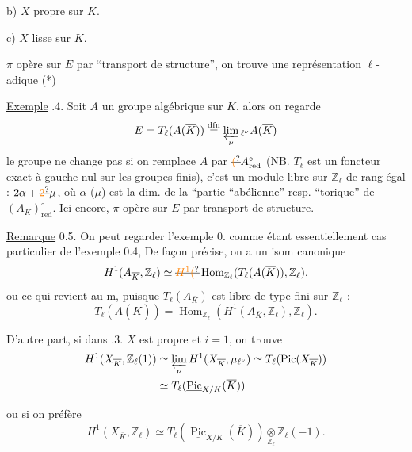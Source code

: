 b) \(X\) propre sur \(K\).

c) \(X\) lisse sur \(K\).

 \(\pi\) opère sur  \(E\) par ``transport de structure'', on trouve une représentation \(\ell\)-adique (*)

\uline{Exemple} .4. Soit \(A\) un  groupe algébrique  sur \(K\).  alors on regarde
\[
E=T_\ell(A(\overline K))\overset{\mathrm{dfn}}{=}\varprojlim_{\nu}{}_{\ell^\nu}A(\overline K)
\]
 le groupe ne change pas si on remplace \(A\) par \(\deleted{\unsure{(}}A^\circ_{\mathrm{red}}\) (NB. \(T_\ell\) est un foncteur exact à gauche nul sur les groupes finis), c'est un  \uline{module libre sur} \(\mathbb Z_\ell\) de rang égal : \(2\alpha+\deleted{\unsure{2}}\mu\), où \(\alpha\) (\(\mu\)) est la dim. de la ``partie ``abélienne'' resp.  ``torique'' de \((A_K)^\circ_{\mathrm{red}}\). Ici encore, \(\pi\) opère sur \(E\) par transport de structure.

\uline{Remarque} 0.5. On peut regarder l'exemple 0. comme étant essentiellement   cas particulier de l'exemple 0.4,  De façon précise, on a un isom canonique
\[
H^1(A_{\overline K},\mathbb Z_\ell)\simeq\deleted{\unsure{H^1(}}\operatorname{Hom}_{\mathbb Z_\ell}(T_\ell(A(\overline K)),\mathbb Z_\ell),
\]
ou ce qui revient au \(\overline{\mathrm m}\), puisque \(T_\ell(A_{\overline K})\) est libre de type fini sur \(\mathbb Z_\ell\) :
\[
T_\ell(A(\overline K))=\operatorname{Hom}_{\mathbb Z_\ell}(H^1(A_{\overline K},\mathbb Z_\ell),\mathbb Z_\ell).
\]

D'autre part,  si  dans .3. \(X\) est propre et \(i=1\), on trouve
\[
\begin{aligned}
H^1(X_{\overline K},\mathbb Z_\ell(1))&\simeq\varprojlim_\nu H^1(X_{\overline K},\mu_{\ell^\nu})\simeq T_\ell(\operatorname{Pic}(X_{\overline K}))\\
&\simeq T_\ell(\underline{\operatorname{Pic}}_{X/K}(\overline K))
\end{aligned}
\]

ou si on préfère
\[
H^1(X_{\overline K},\mathbb Z_\ell)\simeq T_\ell(\underline{\operatorname{Pic}}_{X/K}(\overline K))\underset{\mathbb Z_\ell}{\otimes}\mathbb Z_\ell(-1).
\]

